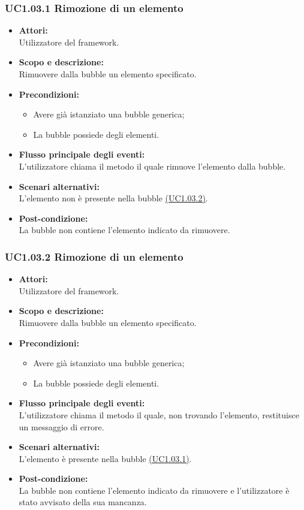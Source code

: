\subsubsection{UC1.03.1 Rimozione di un elemento} \label{UC1.03.1}

\begin{itemize}
	\item \textbf{Attori:}
	\\Utilizzatore del framework.
	\item \textbf{Scopo e descrizione:} 
	\\Rimuovere dalla bubble un elemento specificato.
	\item \textbf{Precondizioni:}
	\begin{itemize}
		\item Avere già istanziato una bubble generica;
		\item La bubble possiede degli elementi.
	\end{itemize}
	\item \textbf{Flusso principale degli eventi:}
	\\L’utilizzatore chiama il metodo il quale rimuove l’elemento dalla bubble.
	\item \textbf{Scenari alternativi:}
	\\L'elemento non è presente nella bubble \hyperref[UC1.03.2]{(UC1.03.2)}.
	\item \textbf{Post-condizione:}
	\\La bubble non contiene l’elemento indicato da rimuovere.
\end{itemize}

\subsubsection{UC1.03.2 Rimozione di un elemento} \label{UC1.03.2}

\begin{itemize}
	\item \textbf{Attori:}
	\\Utilizzatore del framework.
	\item \textbf{Scopo e descrizione:} 
	\\Rimuovere dalla bubble un elemento specificato.
	\item \textbf{Precondizioni:}
	\begin{itemize}
		\item Avere già istanziato una bubble generica;
		\item La bubble possiede degli elementi.
	\end{itemize}
	\item \textbf{Flusso principale degli eventi:}
	\\L’utilizzatore chiama il metodo il quale, non trovando l’elemento, restituisce un messaggio di errore.
	\item \textbf{Scenari alternativi:}
	\\L'elemento è presente nella bubble \hyperref[UC1.03.1]{(UC1.03.1)}.
	\item \textbf{Post-condizione:}
	\\La bubble non contiene l’elemento indicato da rimuovere e l’utilizzatore è stato avvisato della sua mancanza.
\end{itemize}


